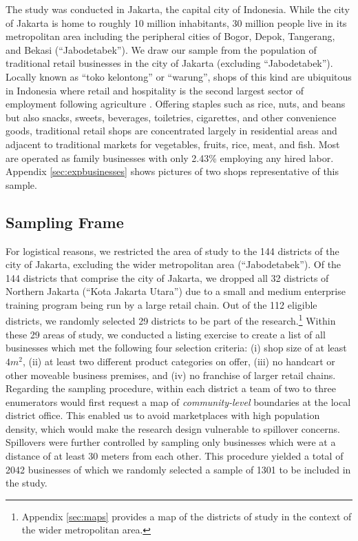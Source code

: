 \documentclass[11.5pt]{article}
\begin{document}
The study was conducted in Jakarta, the capital city of Indonesia. While the city of Jakarta is home to roughly 10 million inhabitants, 30 million people live in its metropolitan area including the peripheral cities of Bogor, Depok, Tangerang, and Bekasi (``Jabodetabek''). We draw our sample from the population of traditional retail businesses in the city of Jakarta (excluding ``Jabodetabek''). Locally known as ``toko kelontong'' or ``warung'', shops of this kind are ubiquitous in Indonesia where retail and hospitality is the second largest sector of employment following agriculture \citep{StatistikUMKM2011}. Offering staples such as rice, nuts, and beans but also snacks, sweets, beverages, toiletries, cigarettes, and other convenience goods, traditional retail shops are concentrated largely in residential areas and adjacent to traditional markets for vegetables, fruits, rice, meat, and fish. Most are operated as family businesses with only 2.43\% employing any hired labor. Appendix \ref{sec:expbusinesses} shows pictures of two shops representative of this sample.


\subsection{Sampling Frame}

For logistical reasons, we restricted the area of study to the 144 districts of the city of Jakarta, excluding the wider metropolitan area (``Jabodetabek''). Of the 144 districts that comprise the city of Jakarta, we dropped all 32 districts of Northern Jakarta (``Kota Jakarta Utara'') due to a small and medium enterprise training program being run by a large retail chain. Out of the 112 eligible districts, we randomly selected 29 districts to be part of the research.\footnote{Appendix \ref{sec:maps} provides a map of the districts of study in the context of the wider metropolitan area.} Within these 29 areas of study, we conducted a listing exercise to create a list of all businesses which met the following four selection criteria: (i) shop size of at least $4m^2$, (ii) at least two different product categories on offer, %
(iii) no handcart or other moveable business premises, and (iv) no franchise of larger retail chains. Regarding the sampling procedure, within each district a team of two to three enumerators would first request a map of \textit{community-level} boundaries at the local district office. This enabled us to avoid marketplaces with high population density, which would make the research design vulnerable to spillover concerns. Spillovers were further controlled by sampling only businesses which were at a distance of at least 30 meters from each other. This procedure yielded a total of 2042 businesses of which we randomly selected a sample of 1301 to be included in the study.
\end{document}
